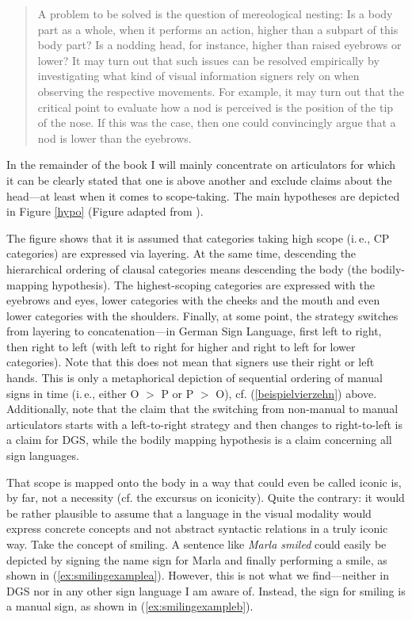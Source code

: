 \begin{quote}
A problem to be solved is the question of mereological nesting: Is a body part as a whole, when it performs an action, higher than a subpart of this body part? Is a nodding head, for instance, higher than raised eyebrows or lower? It may turn out that such issues can be resolved empirically by investigating what kind of visual information signers rely on when observing the respective movements. For example, it may turn out that the critical point to evaluate how a nod is perceived is the position of the tip of the nose. If this was the case, then one could convincingly argue that a nod is lower than the eyebrows. \citep[24]{bross2017scope}
\end{quote}

\noindent In the remainder of the book I will mainly concentrate on articulators for which it can be clearly stated that one is above another and exclude claims about the head---at least when it comes to scope-taking. The main hypotheses are depicted in Figure \ref{hypo} (Figure adapted from \citealt[25]{bross2017scope}).

The figure shows that it is assumed that categories taking high scope (i.\,e., CP categories) are expressed via layering. At the same time, descending the hierarchical ordering of clausal categories means descending the body (the bodily-mapping hypothesis). The highest-scoping categories are expressed with the eyebrows and eyes, lower categories with the cheeks and the mouth and even lower categories with the shoulders. Finally, at some point, the strategy switches from layering to concatenation---in German Sign Language, first left to right, then right to left (with left to right for higher and right to left for lower categories). Note that this does not mean that signers use their right or left hands. This is only a metaphorical depiction of sequential ordering of manual signs in time (i.\,e., either O $>$ P or P $>$ O), cf. (\ref{beispielvierzehn}) above. Additionally, note that the claim that the switching from non-manual to manual articulators starts with a left-to-right strategy and then changes to right-to-left is a claim for DGS, while the bodily mapping hypothesis is a claim concerning all sign languages. 

That scope is mapped onto the body in a way that could even be called iconic is, by far, not a necessity (cf. the excursus on iconicity). Quite the contrary: it would be rather plausible to assume that a language in the visual modality would express concrete concepts and not abstract syntactic relations in a truly iconic way. Take the concept of smiling. A sentence like \textit{Marla smiled} could easily be depicted by signing the name sign for Marla and finally performing a smile, as shown in (\ref{ex:smilingexamplea}). However, this is not what we find---neither in DGS nor in any other sign language I am aware of. Instead, the sign for smiling is a manual sign, as shown in (\ref{ex:smilingexampleb}).

